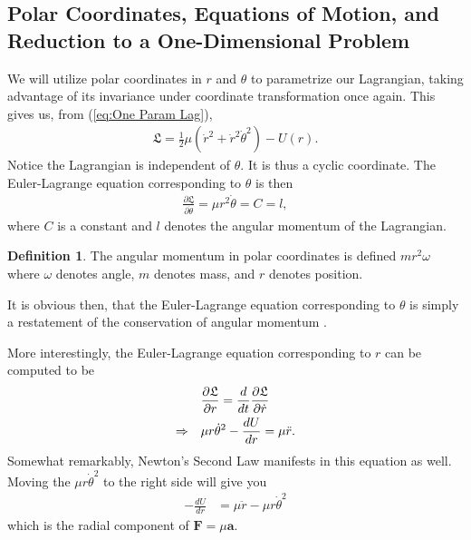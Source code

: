 \documentclass[10pt, psamsfonts]{amsart}
\theoremstyle{definition}
\newtheorem{defn}[thm]{Definition}
\theoremstyle{remark}
\numberwithin{equation}{section}
\begin{document}
\subsection{Polar Coordinates, Equations of Motion, and Reduction to a One-Dimensional Problem} We will utilize polar coordinates in $r$ and $\theta$ to parametrize our Lagrangian, taking advantage of its invariance under coordinate transformation once again. This gives us, from (\ref{eq:One Param Lag}),
\begin{align*}
  \mathfrak{L} = \frac{1}{2} \mu (\dot{r}^2 +\dot{r}^2 \dot{\theta}^2) - U(r).
\end{align*}
Notice the Lagrangian is independent of $\theta$. It is thus a cyclic coordinate. The Euler-Lagrange equation corresponding to $\theta$ is then
\begin{align}
  \label{eq: Theta Eq}
  \frac{\partial \mathfrak{L}}{\partial \dot{\theta}} = \mu r^2 \dot{\theta} = C = l,
\end{align}
where $C$ is a constant and $l$ denotes the angular momentum of the Lagrangian.
\begin{defn}
The angular momentum in polar coordinates is defined $m r^2 \omega$ where $\omega$ denotes angle, $m$ denotes mass, and $r$ denotes position.
\end{defn}
It is obvious then, that the Euler-Lagrange equation corresponding to $\theta$ is simply a restatement of the conservation of angular momentum \cite{3}.

More interestingly, the Euler-Lagrange equation corresponding to $r$ can be computed to be
\begin{align}
  \label{eq: Radial Eq}
  &\frac{\partial \mathfrak{L}}{\partial r} = \frac{d}{dt} \frac{\partial \mathfrak{L}}{\partial \dot{r}} \notag \\
  \Rightarrow\quad& \mu r \dot{\theta}^2 - \frac{dU}{dr} = \mu \ddot{r}.
\end{align}
Somewhat remarkably, Newton's Second Law manifests in this equation as well. Moving the $\mu r \dot{\theta}^2$ to the right side will give you
\begin{align*}
  - \frac{dU}{dr} &= \mu \ddot{r} - \mu r \dot{\theta}^2
\end{align*}
which is the radial component of $\bm{F} = \mu \bm{a}$.
\end{document}
